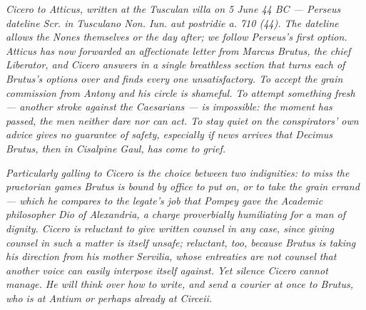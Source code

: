 
\textit{Cicero to Atticus, written at the Tusculan villa on 5
June 44 BC --- Perseus dateline \textit{Scr. in Tusculano Non.
Iun. aut postridie a. 710 (44)}. The dateline allows the Nones
themselves or the day after; we follow Perseus's first option.
Atticus has now forwarded an affectionate letter from Marcus
Brutus, the chief Liberator, and Cicero answers in a single
breathless section that turns each of Brutus's options over and
finds every one unsatisfactory. To accept the grain commission
from Antony and his circle is shameful. To attempt something
fresh --- another stroke against the Caesarians --- is
impossible: the moment has passed, the men neither dare nor can
act. To stay quiet on the conspirators' own advice gives no
guarantee of safety, especially if news arrives that Decimus
Brutus, then in Cisalpine Gaul, has come to grief.}

\textit{Particularly galling to Cicero is the choice between
two indignities: to miss the praetorian games Brutus is bound
by office to put on, or to take the grain errand --- which he
compares to the legate's job that Pompey gave the Academic
philosopher Dio of Alexandria, a charge proverbially humiliating
for a man of dignity. Cicero is reluctant to give written
counsel in any case, since giving counsel in such a matter is
itself unsafe; reluctant, too, because Brutus is taking his
direction from his mother Servilia, whose entreaties are not
counsel that another voice can easily interpose itself against.
Yet silence Cicero cannot manage. He will think over how to
write, and send a courier at once to Brutus, who is at Antium
or perhaps already at Circeii.}
